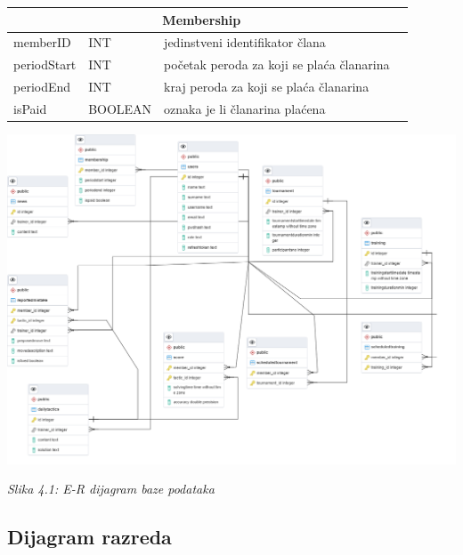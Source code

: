 \documentclass{article}
\begin{document}
\begin{center}
    \begin{tabular}{ | l | l | l | p{5cm} |}
    \hline
    \multicolumn{3}{|c|}{Membership}  \\ \hline
   \cellcolor{green!25}memberID & INT & jedinstveni identifikator člana \\ \hline
    periodStart & INT & početak peroda za koji se plaća članarina \\ \hline
    periodEnd & INT & kraj peroda za koji se plaća članarina \\ \hline
      isPaid & BOOLEAN & oznaka je li članarina plaćena\\ \hline
      
    \end{tabular}
\end{center}



	\includegraphics[width=\columnwidth]{ERbaze.png}
		\begin{center}
			\textit{Slika 4.1: E-R dijagram baze podataka}
		\end{center}

\eject

	\subsection{Dijagram razreda}
\end{document}
